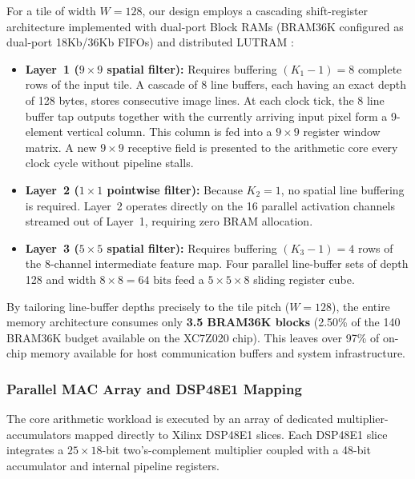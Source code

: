 \documentclass[conference]{IEEEtran}
\begin{document}
For a tile of width $W = 128$, our design employs a cascading shift-register architecture implemented with dual-port Block RAMs (BRAM36K configured as dual-port 18Kb/36Kb FIFOs) and distributed LUTRAM \cite{peemen2013memory, mittal2020survey}:
\begin{itemize}
    \item \textbf{Layer~1 ($9 \times 9$ spatial filter):} Requires buffering $(K_1 - 1) = 8$ complete rows of the input tile. A cascade of 8 line buffers, each having an exact depth of 128 bytes, stores consecutive image lines. At each clock tick, the 8 line buffer tap outputs together with the currently arriving input pixel form a 9-element vertical column. This column is fed into a $9 \times 9$ register window matrix. A new $9 \times 9$ receptive field is presented to the arithmetic core every clock cycle without pipeline stalls.
    \item \textbf{Layer~2 ($1 \times 1$ pointwise filter):} Because $K_2 = 1$, no spatial line buffering is required. Layer~2 operates directly on the 16 parallel activation channels streamed out of Layer~1, requiring zero BRAM allocation.
    \item \textbf{Layer~3 ($5 \times 5$ spatial filter):} Requires buffering $(K_3 - 1) = 4$ rows of the 8-channel intermediate feature map. Four parallel line-buffer sets of depth 128 and width $8 \times 8 = 64\text{ bits}$ feed a $5 \times 5 \times 8$ sliding register cube.
\end{itemize}
By tailoring line-buffer depths precisely to the tile pitch ($W = 128$), the entire memory architecture consumes only \textbf{3.5 BRAM36K blocks} (2.50\% of the 140 BRAM36K budget available on the XC7Z020 chip). This leaves over 97\% of on-chip memory available for host communication buffers and system infrastructure.

\subsubsection{Parallel MAC Array and DSP48E1 Mapping}
The core arithmetic workload is executed by an array of dedicated multiplier-accumulators mapped directly to Xilinx DSP48E1 slices. Each DSP48E1 slice integrates a $25 \times 18$-bit two's-complement multiplier coupled with a 48-bit accumulator and internal pipeline registers.
\end{document}
